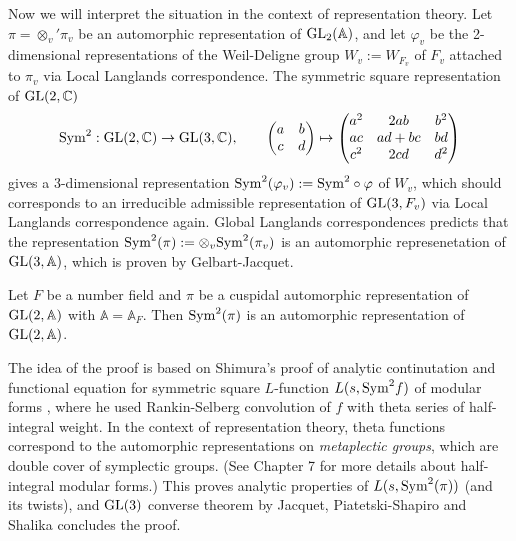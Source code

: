 Now we will interpret the situation in the context of representation theory.
Let $\pi = \otimes_{v}' \pi_{v}$ be an automorphic representation of $\operatorname{\mathrm{GL}}_{2}(\mathbb{A})$, and let $\varphi_{v}$ be the 2-dimensional representations of the Weil-Deligne group $W_{v}:=W_{F_{v}}$ of $F_{v}$ attached to $\pi_{v}$ via Local Langlands correspondence.
The symmetric square representation of $\operatorname{\mathrm{GL}}(2, \mathbb{C})$
\begin{align*}
\mathrm{Sym}^{2}: \operatorname{\mathrm{GL}}(2, \mathbb{C}) \to \operatorname{\mathrm{GL}}(3, \mathbb{C}), \qquad
\begin{pmatrix}
a & b\\ c & d \end{pmatrix} \mapsto \begin{pmatrix}
a^{2} & 2ab & b^{2}\\ ac & ad + bc & bd\\ c^{2} & 2cd & d^{2} \end{pmatrix}
\end{align*}
gives a 3-dimensional representation $\mathrm{Sym}^{2}(\varphi_{v}):=\mathrm{Sym}^{2}\circ\varphi$ of $W_{v}$, which should corresponds to an irreducible admissible representation of $\operatorname{\mathrm{GL}}(3, F_{v})$ via Local Langlands correspondence again.
Global Langlands correspondences predicts that the representation $\mathrm{Sym}^{2}(\pi) := \otimes_{v} \mathrm{Sym}^{2}(\pi_{v})$ is an automorphic represenetation of $\operatorname{\mathrm{GL}}(3, \mathbb{A})$, which is proven by Gelbart-Jacquet.

\begin{theorem}
Let $F$ be a number field and $\pi$ be a cuspidal automorphic representation of $\operatorname{\mathrm{GL}}(2, \mathbb{A})$ with $\mathbb{A} = \mathbb{A}_{F}$.
Then $\mathrm{Sym}^{2}(\pi)$ is an automorphic representation of $\operatorname{\mathrm{GL}}(2, \mathbb{A})$.
\end{theorem}

The idea of the proof is based on Shimura's proof of analytic continutation and functional equation
for symmetric square $L$-function $L(s, \mathrm{Sym}^{2}f)$ of modular forms \cite{shimura1973onmodular},
where he used Rankin-Selberg convolution of $f$ with theta series of half-integral weight.
In the context of representation theory, theta functions correspond to the automorphic representations
on \emph{metaplectic groups}, which are double cover of symplectic groups.
(See Chapter 7 for more details about half-integral modular forms.)
This proves analytic properties of $L(s, \mathrm{Sym}^{2}(\pi))$ (and its twists), and $\operatorname{\mathrm{GL}}(3)$ converse theorem by
Jacquet, Piatetski-Shapiro and Shalika \cite{jacquet1979automorphic1,jacquet1979automorphic2}
concludes the proof.

